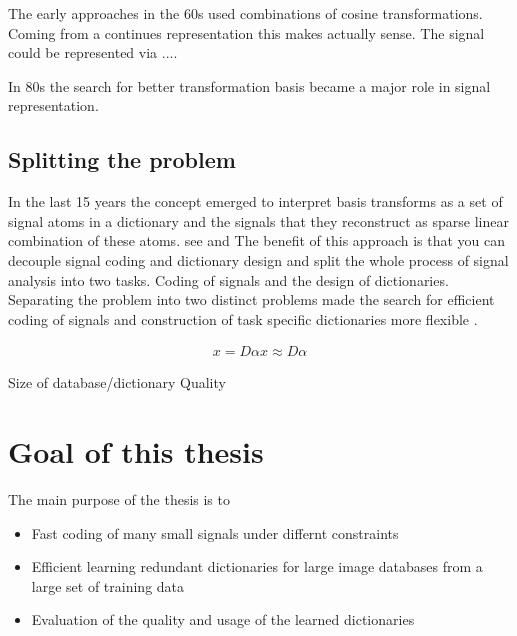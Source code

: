 The early approaches in the 60s used combinations of cosine transformations. Coming from a continues representation this makes 
actually sense. The signal could be represented via ....

In 80s the search for better transformation basis became a major role in signal representation. \cite{}



\subsection{Splitting the problem}
\cite{Rubinstein2010}
In the last 15 years the concept emerged to interpret basis transforms as a set of signal atoms in a dictionary and the signals 
that they reconstruct as sparse linear combination of these atoms.
see \cite{Olshausen1996} and \cite{Mallat1993}
The benefit of this approach is that you can decouple signal coding and dictionary design and split the whole process of signal analysis into two tasks.
Coding of signals and the design of dictionaries.
Separating the problem into two distinct problems made the search for efficient coding of signals and construction of task specific dictionaries more flexible \cite{?}.

\begin{align*}
 x = D\alpha  x \approx D\alpha
\end{align*}


Size of database/dictionary
Quality





\section{Goal of this thesis}

The main purpose of the thesis is to

\begin{itemize}
 \item Fast coding of many small signals under differnt constraints
 \item Efficient learning redundant dictionaries for large image databases from a large set of training data
 \item Evaluation of the quality and usage of the learned dictionaries
\end{itemize}

